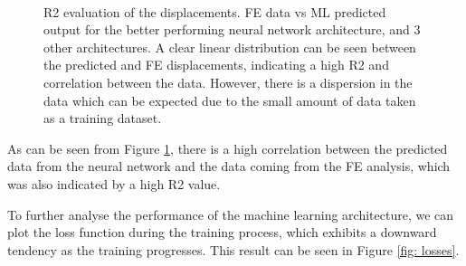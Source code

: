 \begin{figure}[H]
  \centering
   \qquad
  \\
  \pagebreak
   \qquad
  \caption{R2 evaluation of the displacements. FE data vs ML predicted output for the better performing neural network architecture, and 3 other architectures. A clear linear distribution can be seen between the predicted and FE displacements, indicating a high R2 and correlation between the data. However, there is a dispersion in the data which can be expected due to the small amount of data taken as a training dataset.}
  \label{fig: R2_plot}
\end{figure}

\pagebreak

As can be seen from Figure \ref{fig: R2_plot}, there is a high correlation between the predicted data from the neural network and the data coming from the FE analysis, which was also indicated by a high R2 value.

To further analyse the performance of the machine learning architecture, we can plot the loss function during the training process, which exhibits a downward tendency as the training progresses. This result can be seen in Figure \ref{fig: losses}. 


